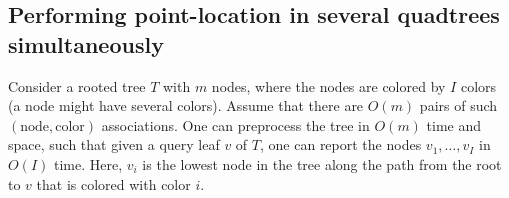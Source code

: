 \documentclass[12pt]{article}
\providecommand{\lemlab}[1]{\label{lemma:#1}}
\theoremstyle{remark}{\theorembodyfont{\rm} \newtheorem{remark}[theorem]{Remark}}
\begin{document}
\subsection{Performing point-location in several quadtrees simultaneously}

\begin{lemma}\lemlab{lowest:color}Consider a rooted tree $T$ with $m$ nodes, where the nodes are
    colored by $I$ colors (a node might have several
    colors). Assume that there are $O(m)$ pairs of such
    $(\text{node},\text{color})$ associations. One can preprocess the
    tree in $O(m)$ time and space, such that given a query leaf $v$ of
    $T$, one can report the nodes $v_1, \ldots, v_I$ in $O(I)$
    time. Here, $v_i$ is the lowest node in the tree along the path
    from the root to $v$ that is colored with color $i$.
\end{lemma}
\end{document}
